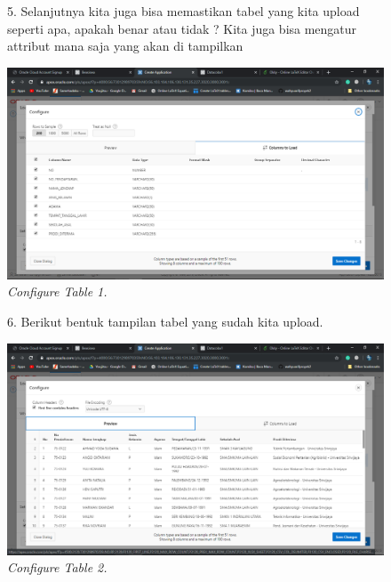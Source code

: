 \begin{enumerate}
    \begin{figure}[!htbp]
    \item[5.] Selanjutnya kita juga bisa memastikan tabel yang kita upload seperti apa, apakah benar atau tidak ? Kita juga bisa mengatur attribut mana saja yang akan di tampilkan
    \begin{center}
    \includegraphics[scale=0.3]{figures/Screenshot(76).png}
    \caption{\textit{Configure Table 1.}}
    \end{center}   
    \end{figure}
    
    \begin{figure}[!htbp]
    \item[6.] Berikut bentuk tampilan tabel yang sudah kita upload.
    \begin{center}
    \includegraphics[scale=0.3]{figures/Screenshot(77).png}
    \caption{\textit{Configure Table 2.}}
    \end{center}   
    \end{figure}
    

\end{enumerate}
